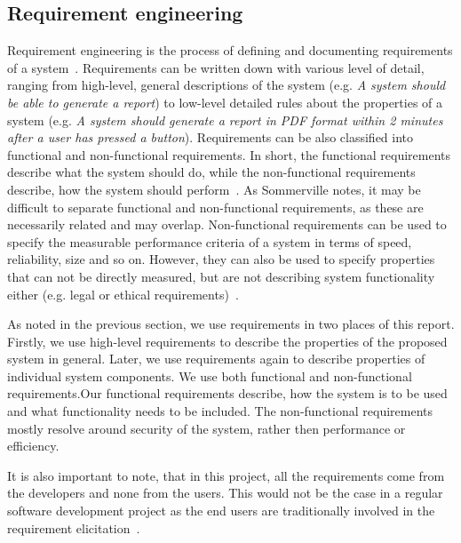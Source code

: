 \subsection{Requirement engineering}

Requirement engineering is the process of defining and documenting requirements of a system~\cite{Sommerville2011SoftwareEngineering}. Requirements can be written down with various level of detail, ranging from high-level, general descriptions of the system (e.g. \textit{A system should be able to generate a report}) to low-level detailed rules about the properties of a system (e.g. \textit{A system should generate a report in PDF format within 2 minutes after a user has pressed a button}). Requirements can be also classified into functional and non-functional requirements. In short, the functional requirements describe what the system should do, while the non-functional requirements describe, how the system should perform~\cite{Sommerville2011SoftwareEngineering}. As Sommerville notes, it may be difficult to separate functional and non-functional requirements, as these are necessarily related and may overlap. Non-functional requirements can be used to specify the measurable performance criteria of a system in terms of speed, reliability, size and so on. However, they can also be used to specify properties that can not be directly measured, but are not describing system functionality either (e.g. legal or ethical requirements)~\cite{Sommerville2011SoftwareEngineering}. 

As noted in the previous section, we use requirements in two places of this report. Firstly, we use high-level requirements to describe the properties of the proposed system in general. Later, we use requirements again to describe properties of individual system components. We use both functional and non-functional requirements.Our functional requirements describe, how the system is to be used and what functionality needs to be included. The non-functional requirements mostly resolve around security of the system, rather then performance or efficiency.

It is also important to note, that in this project, all the requirements come from the developers and none from the users. This would not be the case in a regular software development project as the end users are traditionally involved in the requirement elicitation~\cite{Kujala2005TheSuccess}.